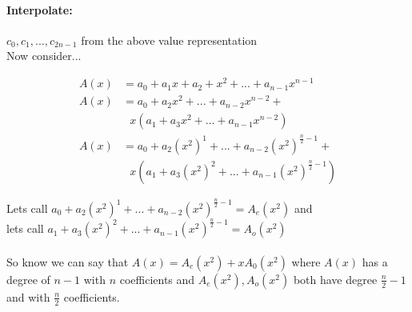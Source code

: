 \documentclass[12pt]{article}
\begin{document}
\paragraph{Interpolate:} $c_0, c_1, ..., c_{2n-1}$ from the above value representation
\\
Now consider...

\begin{align*}
	A(x) &= a_0 + a_1 x + a_2 +x^2 + ... + a_{n-1} x^{n-1}\\
	A(x) &= a_0 + a_2 x^2 + ... + a_{n-2} x^{n-2} +\\
		& \:\:\:x(a_1 + a_3 x^2 + ... + a_{n-1} x^{n-2})\\
	A(x) &= a_0 + a_2 (x^2)^1 + ... + a_{n-2} (x^2)^{\frac{n}{2}-1} +\\
		& \:\:\:x(a_1 + a_3 (x^2)^2 + ... + a_{n-1} (x^2)^{\frac{n}{2}-1})
\end{align*}

Lets call $a_0 + a_2 (x^2)^1 + ... + a_{n-2} (x^2)^{\frac{n}{2}-1} = A_e (x^2)$ and\\
lets call $a_1 + a_3 (x^2)^2 + ... + a_{n-1} (x^2)^{\frac{n}{2}-1} = A_o (x^2)$\\
\\
So know we can say that $A(x) = A_e (x^2) + x A_0 (x^2)$ where $A(x)$ has a degree of $n-1$ with $n$ coefficients and $A_e (x^2), A_o (x^2)$ both have degree $\frac{n}{2}-1$ and with $\frac{n}{2}$ coefficients.
\end{document}

